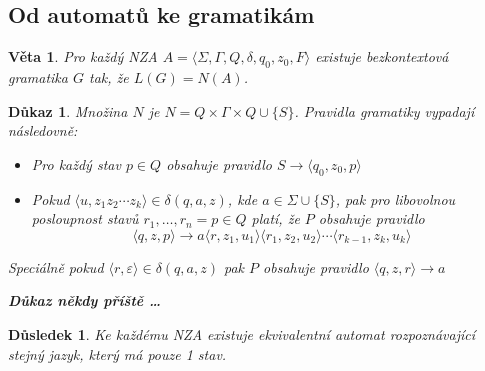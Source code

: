 \documentclass[10pt, a4paper, titlepage]{article}
\theoremstyle{note}
\newtheorem{veta}{Věta}
\newtheorem{dukaz}{Důkaz}
\newtheorem{dusledek}{Důsledek}
\begin{document}
\subsection{Od automatů ke gramatikám}

\begin{veta}
Pro každý NZA $A=\langle \Sigma,\Gamma,Q,\delta,q_0,z_0,F \rangle$ existuje bezkontextová gramatika $G$ tak, že $L(G)=N(A)$.
\end{veta}

\begin{dukaz}
Množina $N$ je $N=Q \times \Gamma \times Q \cup \lbrace S \rbrace$.
Pravidla gramatiky vypadají následovně:
\begin{itemize}
\item
Pro každý stav $p \in Q$ obsahuje pravidlo $S \rightarrow \langle q_0,z_0,p \rangle$
\item
Pokud $\langle u,z_1z_2\cdots z_k \rangle \in \delta(q,a,z)$, kde $a \in \Sigma \cup \lbrace S \rbrace$, pak pro
libovolnou posloupnost stavů $r_1,\ldots,r_n=p \in Q$ platí, že $P$ obsahuje pravidlo
$$\langle q,z,p \rangle \rightarrow a\langle r,z_1,u_1 \rangle\langle r_1,z_2,u_2 \rangle \cdots \langle r_{k-1},z_k,u_k \rangle$$
\end{itemize}

Speciálně pokud $\langle r, \varepsilon \rangle \in \delta(q,a,z)$ pak $P$ obsahuje pravidlo $\langle q,z,r \rangle \rightarrow a$

\textbf{Důkaz někdy příště \ldots}
\end{dukaz}

\begin{dusledek}
Ke každému NZA existuje ekvivalentní automat rozpoznávající stejný jazyk, který má pouze 1 stav.
\end{dusledek}


\renewcommand{\indexcolumns}{3}
\printindex
\end{document}
